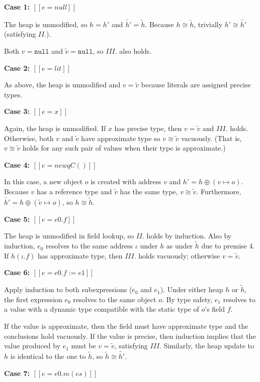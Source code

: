 \documentclass[final,10pt,twoside]{article}
\newcommand\proofcase[1]{\vspace{4mm plus 1mm minus 1mm}\noindent\textbf{#1}}
\begin{document}
\proofcase{Case 1: $[[e = null]]$}

The heap is unmodified, so $h = h'$ and $\tilde{h'} = \tilde{h}$. Because
$h \cong \tilde{h}$, trivially $h' \cong \tilde{h'}$ (satisfying $II.$).

Both $v = \mathtt{null}$ and $\tilde{v} = \mathtt{null}$, so $III.$ also holds.

\proofcase{Case 2: $[[e = lit]]$}

As above, the heap is unmodified and $v = \tilde{v}$ because literals are
assigned precise types.

\proofcase{Case 3: $[[e = x]]$}

Again, the heap is unmodified. If $x$ has precise type, then $v = \tilde{v}$ and
$III.$ holds. Otherwise, both $v$ and $\tilde{v}$ have approximate type so
$v \cong \tilde{v}$ vacuously. (That is, $v \cong \tilde{v}$ holds for any such
pair of values when their type is approximate.)

\proofcase{Case 4: $[[e = new qC()]]$}

In this case, a new
object $o$ is created with address $v$ and
$h' = h \oplus (v \mapsto o)$. Because $v$ has a reference type and $\tilde{v}$
has the same type, $v \cong \tilde{v}$. Furthermore,
$\tilde{h'} = h \oplus (\tilde{v} \mapsto o)$, so $h \cong \tilde{h}$.

\proofcase{Case 5: $[[e = e0.f]]$}

The heap is unmodified in field lookup, so $II.$ holds by induction. Also by
induction, $e_0$ resolves to the same address $\iota$ under $h$ as under
$\tilde{h}$ due to premise 4. If $h(\iota.f)$ has approximate type,
then $III.$ holds vacuously; otherwise $v = \tilde{v}$.

\proofcase{Case 6: $[[e = e0.f := e1]]$}

Apply induction to both subexpressions ($e_0$ and $e_1$). Under either heap $h$
or $\tilde{h}$, the first expression $e_0$ resolves to the same object $o$. By
type safety, $e_1$ resolves to a value with a dynamic type compatible
with the static type of $o$'s field $f$.

If the value is approximate, then the field must have approximate type and the
conclusions hold vacuously. If the value is precise, then induction implies that
the value produced by $e_1$ must be $v = \tilde{v}$, satisfying $III.$
Similarly, the heap update to $h$ is identical to the one to $\tilde{h}$, so
$\tilde{h} \cong \tilde{h'}$.

\proofcase{Case 7: $[[e = e0.m(es)]]$}
\end{document}
